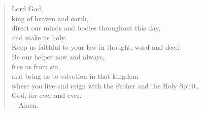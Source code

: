 \prayer

\setlength{\vleftmargin}{\prayerleftmargini}

\begin{verse}
Lord God,\\
king of heaven and earth,\\
direct our minds and bodies throughout this day,\\
and make us holy.\\
Keep us faithful to your law in thought, word and deed.\\
Be our helper now and always,\\
free us from sin,\\
and bring us to salvation in that kingdom\\
where you live and reign with the Father and the Holy Spirit,\\
God, for ever and ever.\\
{\color{red}---\thinspace}Amen.
\end{verse}

\setlength{\vleftmargin}{\defleftmargini}